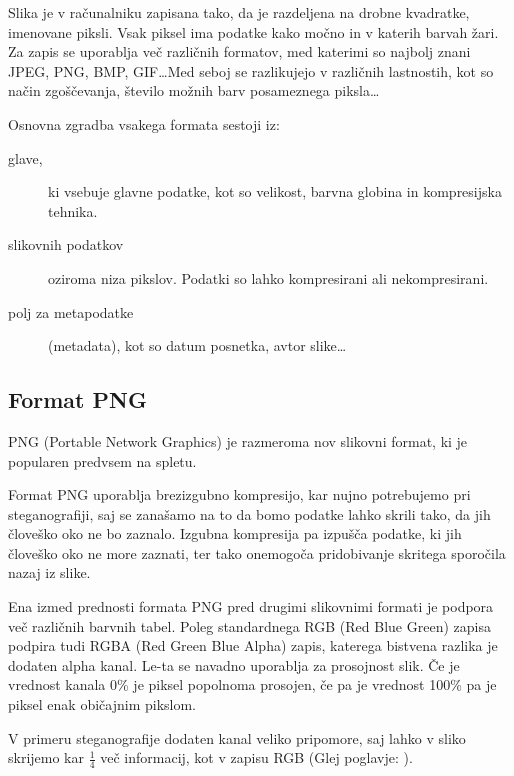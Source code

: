 \label{zapisslik}
Slika je v računalniku zapisana tako, da je razdeljena na drobne kvadratke, imenovane piksli. Vsak piksel ima podatke kako močno in v katerih barvah žari. Za zapis se uporablja več različnih formatov, med katerimi so najbolj znani JPEG, PNG, BMP, GIF\ldots Med seboj se razlikujejo v različnih lastnostih, kot so način zgoščevanja, število možnih barv posameznega piksla\ldots

Osnovna zgradba vsakega formata sestoji iz:
\begin{description}
    \item [glave,] ki vsebuje glavne podatke, kot so velikost, barvna globina in kompresijska tehnika. 
    \item [slikovnih podatkov] oziroma niza pikslov. Podatki so lahko kompresirani ali nekompresirani.
    \item [polj za metapodatke] (metadata), kot so datum posnetka, avtor slike\ldots
\end{description} 

\subsection{Format PNG}
    PNG (Portable Network Graphics) je razmeroma nov slikovni format, ki je popularen predvsem na spletu.

    Format PNG uporablja brezizgubno kompresijo, kar nujno potrebujemo pri steganografiji, saj se zanašamo na to da bomo podatke lahko skrili tako, da jih človeško oko ne bo zaznalo. Izgubna kompresija pa izpušča podatke, ki jih človeško oko ne more zaznati, ter tako onemogoča pridobivanje skritega sporočila nazaj iz slike.

    Ena izmed prednosti formata PNG pred drugimi slikovnimi formati je podpora več različnih barvnih tabel. Poleg standardnega RGB (Red Blue Green) zapisa podpira tudi RGBA (Red Green Blue Alpha) zapis, katerega bistvena razlika je dodaten alpha kanal. Le-ta se navadno uporablja za prosojnost slik. Če je vrednost kanala 0\% je piksel popolnoma prosojen, če pa je vrednost 100\% pa je piksel enak običajnim pikslom.

    V primeru steganografije dodaten kanal veliko pripomore, saj lahko v sliko skrijemo kar $\frac{1}{4}$ več informacij, kot v zapisu RGB (Glej poglavje: ).
